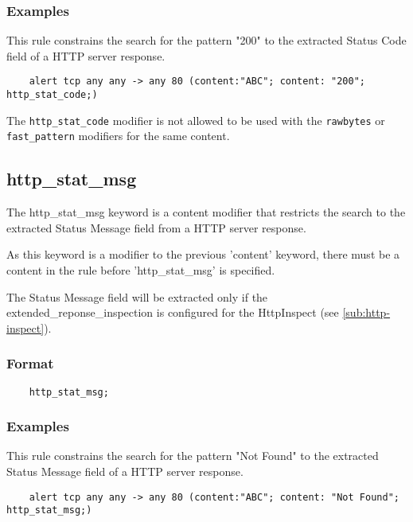 \documentclass[english]{report}
\newenvironment{note}{
\samepage
    \vspace{10pt}{\textsf{
        {\hspace{7pt}\Huge{$\triangle$\hspace{-12.5pt}{\Large{$^!$}}}}\hspace{5pt}
        {\Large{NOTE}}
    }
    }
   \begin{center}
    \par\vspace{-17pt}

    \begin{lrbox}{\savepar}
    \begin{minipage}[r]{6in}
}
{
    \end{minipage}
    \end{lrbox}
    \fbox{
        \usebox{
            \savepar
	}
    }
    \par\vskip10pt
    \end{center}
}
\newenvironment{note}{
        \begin{rawhtml}
        <p><table border="1"><tr><td><b>
        Note:&nbsp;&nbsp;</b>
        \end{rawhtml}
}{
        \begin{rawhtml}
        </b></td></tr></table></p>
        \end{rawhtml}
}
\begin{document}
\subsubsection{Examples}

This rule constrains the search for the pattern "200" to the extracted Status Code field 
of a HTTP server response.

\begin{verbatim}
    alert tcp any any -> any 80 (content:"ABC"; content: "200"; http_stat_code;)
\end{verbatim}

\begin{note}

The \texttt{http\_stat\_code} modifier is not allowed to be used with the
\texttt{rawbytes} or \texttt{fast\_pattern} modifiers for the same content.

\end{note}

\subsection{http\_stat\_msg}
\label{sub:HttpStatMsg}

The http\_stat\_msg keyword is a content modifier that restricts the search to the
extracted Status Message field from a HTTP server response.

As this keyword is a modifier to the previous 'content' keyword, there must be
a content in the rule before 'http\_stat\_msg' is specified.

The Status Message field will be extracted only if the extended\_reponse\_inspection is
configured for the HttpInspect (see \ref{sub:http-inspect}).

\subsubsection{Format}

\begin{verbatim}
    http_stat_msg;
\end{verbatim}

\subsubsection{Examples}

This rule constrains the search for the pattern "Not Found" to the extracted Status 
Message field of a HTTP server response.

\begin{verbatim}
    alert tcp any any -> any 80 (content:"ABC"; content: "Not Found"; http_stat_msg;)
\end{verbatim}
\end{document}
